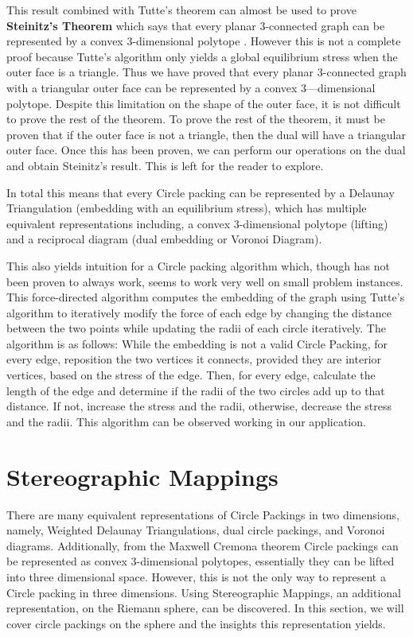 \documentclass[11pt]{article}
\begin{document}
 This result combined with Tutte's theorem can almost be used to prove \textbf{Steinitz's Theorem} which says that every planar 3-connected graph can be represented by a convex 3-dimensional polytope \cite{realizationSpaces}. However this is not a complete proof because Tutte's algorithm only yields a global equilibrium stress when the outer face is a triangle. Thus we have proved that every planar 3-connected graph with a triangular outer face can be represented by a convex 3---dimensional polytope. Despite this limitation on the shape of the outer face, it is not difficult to prove the rest of the theorem. To prove the rest of the theorem, it must be proven that if the outer face is not a triangle, then the dual will have a triangular outer face. Once this has been proven, we can perform our operations on the dual and obtain Steinitz's result. This is left for the reader to explore.
 
 In total this means that every Circle packing can be represented by a Delaunay Triangulation (embedding with an equilibrium stress), which has multiple equivalent representations including, a convex 3-dimensional polytope (lifting) and a reciprocal diagram (dual embedding or Voronoi Diagram). 

This also yields intuition for a Circle packing algorithm which, though has not been proven to always work, seems to work very well on small problem instances. This force-directed algorithm computes the embedding of the graph using Tutte's algorithm to iteratively modify the force of each edge by changing the distance between the two points while updating the radii of each circle iteratively. The algorithm is as follows: While the embedding is not a valid Circle Packing, for every edge, reposition the two vertices it connects, provided they are interior vertices, based on the stress of the edge. Then, for every edge, calculate the length of the edge and determine if the radii of the two circles add up to that distance. If not, increase the stress and the radii, otherwise, decrease the stress and the radii. This algorithm can be observed working in our application.
 
\section{Stereographic Mappings}
There are many equivalent representations of Circle Packings in two dimensions, namely, Weighted Delaunay Triangulations, dual circle packings, and Voronoi diagrams. Additionally, from the Maxwell Cremona theorem Circle packings can be represented as convex 3-dimensional polytopes, essentially they can be lifted into three dimensional space. However, this is not the only way to represent a Circle packing in three dimensions. Using Stereographic Mappings, an additional representation, on the Riemann sphere,  can be discovered. In this section, we will cover circle packings on the sphere and the insights this representation yields.
\end{document}
